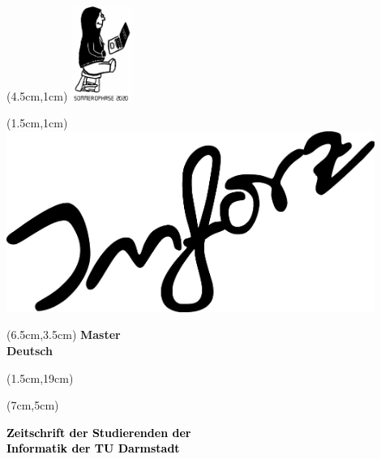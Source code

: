 \begin{titlepage}~


    \begin{textblock*}{12cm}(4.5cm,1cm)
        \includegraphics[width=2cm]{../grafik/wesen/wesen_ophase}
    \end{textblock*}

    \begin{textblock*}{12cm}(1.5cm,1cm)
        \includegraphics[width=12cm]{../grafik/inforz_schwarz}
    \end{textblock*}


    \begin{textblock*}{12cm}(6.5cm,3.5cm)
        \centering\fontsize{25}{25}\sffamily\textbf{
            \textcolor{mycolor}{Master } \\
            \textcolor{mycolor}{Deutsch}}
    \end{textblock*}



    \begin{textblock*}{12cm}(1.5cm,19cm)
    \end{textblock*}


    \begin{textblock*}{7cm}(7cm,5cm)
        \begin{flushright}
            \large\sffamily\textbf{
                \textcolor{black}{Zeitschrift der Studierenden der}\\
                \textcolor{black}{Informatik der TU Darmstadt}}
        \end{flushright}
    \end{textblock*}


\end{titlepage}
